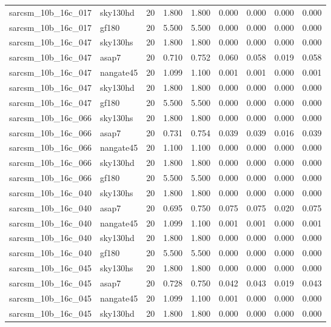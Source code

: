 \begin{tabular}{llrrrrrrr}
sarcsm\_10b\_16c\_017 & sky130hd & 20 & 1.800 & 1.800 & 0.000 & 0.000 & 0.000 & 0.000 \\
sarcsm\_10b\_16c\_017 & gf180 & 20 & 5.500 & 5.500 & 0.000 & 0.000 & 0.000 & 0.000 \\
sarcsm\_10b\_16c\_047 & sky130hs & 20 & 1.800 & 1.800 & 0.000 & 0.000 & 0.000 & 0.000 \\
sarcsm\_10b\_16c\_047 & asap7 & 20 & 0.710 & 0.752 & 0.060 & 0.058 & 0.019 & 0.058 \\
sarcsm\_10b\_16c\_047 & nangate45 & 20 & 1.099 & 1.100 & 0.001 & 0.001 & 0.000 & 0.001 \\
sarcsm\_10b\_16c\_047 & sky130hd & 20 & 1.800 & 1.800 & 0.000 & 0.000 & 0.000 & 0.000 \\
sarcsm\_10b\_16c\_047 & gf180 & 20 & 5.500 & 5.500 & 0.000 & 0.000 & 0.000 & 0.000 \\
sarcsm\_10b\_16c\_066 & sky130hs & 20 & 1.800 & 1.800 & 0.000 & 0.000 & 0.000 & 0.000 \\
sarcsm\_10b\_16c\_066 & asap7 & 20 & 0.731 & 0.754 & 0.039 & 0.039 & 0.016 & 0.039 \\
sarcsm\_10b\_16c\_066 & nangate45 & 20 & 1.100 & 1.100 & 0.000 & 0.000 & 0.000 & 0.000 \\
sarcsm\_10b\_16c\_066 & sky130hd & 20 & 1.800 & 1.800 & 0.000 & 0.000 & 0.000 & 0.000 \\
sarcsm\_10b\_16c\_066 & gf180 & 20 & 5.500 & 5.500 & 0.000 & 0.000 & 0.000 & 0.000 \\
sarcsm\_10b\_16c\_040 & sky130hs & 20 & 1.800 & 1.800 & 0.000 & 0.000 & 0.000 & 0.000 \\
sarcsm\_10b\_16c\_040 & asap7 & 20 & 0.695 & 0.750 & 0.075 & 0.075 & 0.020 & 0.075 \\
sarcsm\_10b\_16c\_040 & nangate45 & 20 & 1.099 & 1.100 & 0.001 & 0.001 & 0.000 & 0.001 \\
sarcsm\_10b\_16c\_040 & sky130hd & 20 & 1.800 & 1.800 & 0.000 & 0.000 & 0.000 & 0.000 \\
sarcsm\_10b\_16c\_040 & gf180 & 20 & 5.500 & 5.500 & 0.000 & 0.000 & 0.000 & 0.000 \\
sarcsm\_10b\_16c\_045 & sky130hs & 20 & 1.800 & 1.800 & 0.000 & 0.000 & 0.000 & 0.000 \\
sarcsm\_10b\_16c\_045 & asap7 & 20 & 0.728 & 0.750 & 0.042 & 0.043 & 0.019 & 0.043 \\
sarcsm\_10b\_16c\_045 & nangate45 & 20 & 1.099 & 1.100 & 0.001 & 0.000 & 0.000 & 0.000 \\
sarcsm\_10b\_16c\_045 & sky130hd & 20 & 1.800 & 1.800 & 0.000 & 0.000 & 0.000 & 0.000 \\

\end{tabular}
